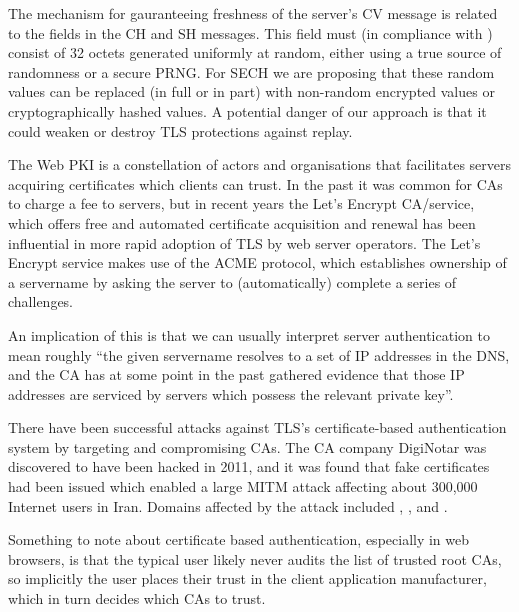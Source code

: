 The mechanism for gauranteeing freshness of the server's \ac{CV} message is related to the  fields in the \ac{CH} and \ac{SH} messages.
This field must (in compliance with \cite{rfc8446}) consist of 32 octets generated
uniformly at random,
either using a true source of randomness or a secure \ac{PRNG}.
For \ac{SECH} we are proposing that these random values
can be replaced (in full or in part) with non-random
encrypted values or cryptographically hashed values.
A potential danger of our approach is that it could weaken
or destroy \ac{TLS} protections against replay.

The Web \ac{PKI} is a constellation of actors
and organisations that facilitates
servers acquiring certificates
which clients can trust.
In the past it was common for \ac{CA}s to charge a fee to servers,
but in recent years the Let's Encrypt \ac{CA}/service,
which offers free and automated certificate acquisition and renewal
has been influential in more rapid adoption of \ac{TLS} by
web server operators.
The Let's Encrypt service makes use of the \ac{ACME} protocol,
which establishes ownership of a servername by
asking the server to (automatically) complete a series of challenges.

An implication of this is that we can usually interpret
server authentication to mean roughly
``the given servername resolves to a set of \ac{IP} addresses in the \ac{DNS},
and the \ac{CA} has at some point in the past gathered
evidence that those \ac{IP} addresses are serviced by
servers which possess the relevant private key''.

There have been successful attacks against \ac{TLS}'s certificate-based
authentication system by targeting and compromising \ac{CA}s.
The \ac{CA} company DigiNotar was discovered to have been hacked in 2011, and it was found
that fake certificates had been issued which enabled a large \ac{MITM} attack affecting about 300,000 Internet users in Iran.
Domains affected by the attack included , , and  \citep{van2013diginotar}.

Something to note about certificate based authentication, especially
in web browsers, is that the typical user likely never audits the list of
trusted root \ac{CA}s,
so implicitly the user places their trust in the
client application manufacturer,
which in turn decides which \ac{CA}s to trust.


